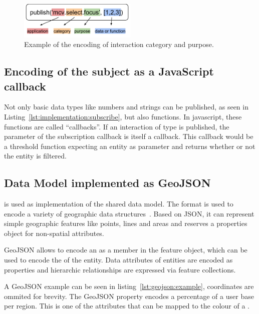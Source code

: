 \begin{figure}[ht]
  \centering
  \includegraphics[width=0.5\textwidth]{figures/implementation/Encoding}
  \caption{%
    Example of the encoding of interaction category and purpose.
  }\label{fig:implementation:encoding}
\end{figure}

\subsection{Encoding of the subject as a JavaScript callback}
Not only basic data types like numbers and strings can be published, as seen in Listing~\ref{lst:implementation:subscribe}, but also functions.
In javascript, these functions are called ``callbacks''.
If an interaction of type  is published, the  parameter of the subscription callback is itself a callback.
This callback would be a threshold function expecting an entity as parameter and returns whether or not the entity is filtered.



\subsection{Data Model implemented as GeoJSON}

 is used as implementation of the shared data model.
The format is used to encode a variety of geographic data structures~\parencite{GeoJSON2017}.
Based on JSON, it can represent simple geographic features like points, lines and areas and reserves a properties object for non-spatial attributes.

GeoJSON allows to encode an  as a member in the feature object, which can be used to encode the  of the entity.
Data attributes of entities are encoded as properties and hierarchic relationships are expressed via feature collections.

A GeoJSON example can be seen in listing~\ref{lst:geojson:example}, coordinates are ommited for brevity.
The GeoJSON property  encodes a percentage of a user base per region.
This is one of the attributes that can be mapped to the colour of a \tmap{}.

